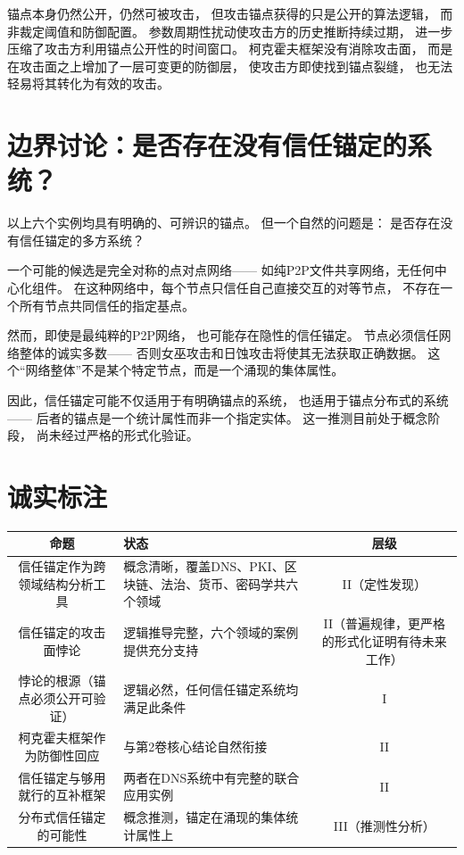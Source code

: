 \documentclass[11pt,a4paper]{article}
\begin{document}
锚点本身仍然公开，仍然可被攻击，
但攻击锚点获得的只是公开的算法逻辑，
而非裁定阈值和防御配置。
参数周期性扰动使攻击方的历史推断持续过期，
进一步压缩了攻击方利用锚点公开性的时间窗口。
柯克霍夫框架没有消除攻击面，
而是在攻击面之上增加了一层可变更的防御层，
使攻击方即使找到锚点裂缝，
也无法轻易将其转化为有效的攻击。

\section{边界讨论：是否存在没有信任锚定的系统？}

以上六个实例均具有明确的、可辨识的锚点。
但一个自然的问题是：
是否存在没有信任锚定的多方系统？

一个可能的候选是完全对称的点对点网络——
如纯P2P文件共享网络，无任何中心化组件。
在这种网络中，每个节点只信任自己直接交互的对等节点，
不存在一个所有节点共同信任的指定基点。

然而，即使是最纯粹的P2P网络，
也可能存在隐性的信任锚定。
节点必须信任网络整体的诚实多数——
否则女巫攻击和日蚀攻击将使其无法获取正确数据。
这个“网络整体”不是某个特定节点，而是一个涌现的集体属性。

因此，信任锚定可能不仅适用于有明确锚点的系统，
也适用于锚点分布式的系统——
后者的锚点是一个统计属性而非一个指定实体。
这一推测目前处于概念阶段，
尚未经过严格的形式化验证。

\section{诚实标注}

\begin{center}
\begin{xltabular}{\textwidth}{c|X|c}
\toprule
\textbf{命题} & \textbf{状态} & \textbf{层级} \\
\midrule
信任锚定作为跨领域结构分析工具 &
概念清晰，覆盖DNS、PKI、区块链、法治、货币、密码学共六个领域 &
II（定性发现） \\
信任锚定的攻击面悖论 &
逻辑推导完整，六个领域的案例提供充分支持 &
II（普遍规律，更严格的形式化证明有待未来工作） \\
悖论的根源（锚点必须公开可验证） &
逻辑必然，任何信任锚定系统均满足此条件 &
I \\
柯克霍夫框架作为防御性回应 &
与第2卷核心结论自然衔接 &
II \\
信任锚定与够用就行的互补框架 &
两者在DNS系统中有完整的联合应用实例 &
II \\
分布式信任锚定的可能性 &
概念推测，锚定在涌现的集体统计属性上 &
III（推测性分析） \\
\bottomrule
\end{xltabular}
\end{center}
\end{document}
